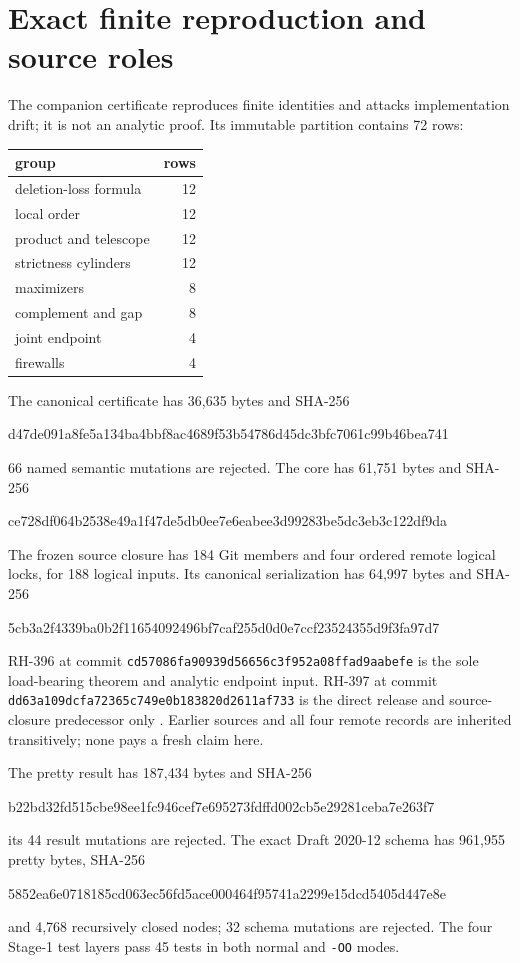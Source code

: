 \documentclass[12pt,a4paper]{article}
\theoremstyle{definition}
\begin{document}
\section{Exact finite reproduction and source roles}

The companion certificate reproduces finite identities and attacks
implementation drift; it is not an analytic proof.  Its immutable partition
contains 72 rows:
\begin{center}
\begin{tabular}{@{}lr@{}}
\toprule
group & rows\\ \midrule
deletion-loss formula & 12\\
local order & 12\\
product and telescope & 12\\
strictness cylinders & 12\\
maximizers & 8\\
complement and gap & 8\\
joint endpoint & 4\\
firewalls & 4\\ \bottomrule
\end{tabular}
\end{center}
The canonical certificate has 36,635 bytes and SHA-256
\begin{center}
\scriptsize\ttfamily
d47de091a8fe5a134ba4bbf8ac4689f53b54786d45dc3bfc7061c99b46bea741
\end{center}
66 named semantic mutations are rejected.  The core has 61,751 bytes and
SHA-256
\begin{center}
\scriptsize\ttfamily
ce728df064b2538e49a1f47de5db0ee7e6eabee3d99283be5dc3eb3c122df9da
\end{center}

The frozen source closure has 184 Git members and four ordered remote logical
locks, for 188 logical inputs.  Its canonical serialization has 64,997 bytes
and SHA-256
\begin{center}
\scriptsize\ttfamily
5cb3a2f4339ba0b2f11654092496bf7caf255d0d0e7ccf23524355d9f3fa97d7
\end{center}
RH-396 at commit
\texttt{cd57086fa90939d56656c3f952a08ffad9aabefe} is the sole load-bearing
theorem and analytic endpoint input.  RH-397 at commit
\texttt{dd63a109dcfa72365c749e0b183820d2611af733} is the direct release and
source-closure predecessor only \cite{RH397}.  Earlier sources and all four
remote records are inherited transitively; none pays a fresh claim here.

The pretty result has 187,434 bytes and SHA-256
\begin{center}
\scriptsize\ttfamily
b22bd32fd515cbe98ee1fc946cef7e695273fdffd002cb5e29281ceba7e263f7
\end{center}
its 44 result mutations are rejected.  The exact Draft 2020-12 schema has
961,955 pretty bytes, SHA-256
\begin{center}
\scriptsize\ttfamily
5852ea6e0718185cd063ec56fd5ace000464f95741a2299e15dcd5405d447e8e
\end{center}
and 4,768 recursively closed nodes; 32 schema mutations are rejected.  The
four Stage-1 test layers pass 45 tests in both normal and \texttt{-OO} modes.
\end{document}
